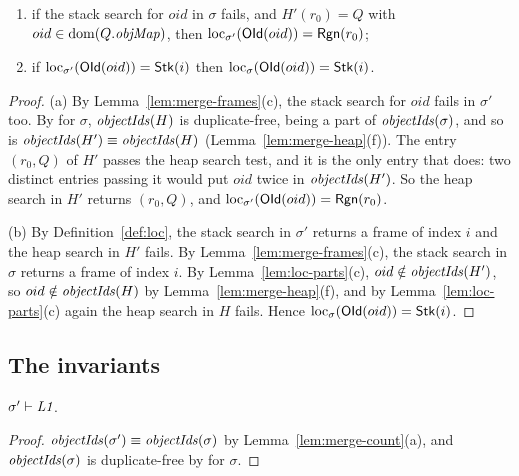 \begin{lemma}
\label{lem:merge-loc}
\begin{enumerate}[nosep,label=(\alph*)]
  \item if the stack search for $oid$ in $\sigma$ fails, and $H'(r_0) = Q$ with
    $oid \in \mathrm{dom}(Q.\mathit{objMap})$, then $\mathrm{loc}_{\sigma'}(\mathsf{OId}(oid)) = \mathsf{Rgn}(r_0)$;
  \item if $\mathrm{loc}_{\sigma'}(\mathsf{OId}(oid)) = \mathsf{Stk}(i)$ then $\mathrm{loc}_{\sigma}(\mathsf{OId}(oid)) = \mathsf{Stk}(i)$.
\end{enumerate}
\end{lemma}
\begin{proof}
(a) By Lemma~\ref{lem:merge-frames}(c), the stack search for $oid$ fails in $\sigma'$ too. By 
for $\sigma$, $\mathit{objectIds}(H)$ is duplicate-free, being a part of $\mathit{objectIds}(\sigma)$, and so is $\mathit{objectIds}(H') \equiv \mathit{objectIds}(H)$
(Lemma~\ref{lem:merge-heap}(f)). The entry $(r_0, Q)$ of $H'$ passes the heap search test, and it is the
only entry that does: two distinct entries passing it would put $oid$ twice in $\mathit{objectIds}(H')$. So the
heap search in $H'$ returns $(r_0, Q)$, and $\mathrm{loc}_{\sigma'}(\mathsf{OId}(oid)) = \mathsf{Rgn}(r_0)$.

(b) By Definition~\ref{def:loc}, the stack search in $\sigma'$ returns a frame of index $i$ and the
heap search in $H'$ fails. By Lemma~\ref{lem:merge-frames}(c), the stack search in $\sigma$ returns a
frame of index $i$. By Lemma~\ref{lem:loc-parts}(c), $oid \notin \mathit{objectIds}(H')$, so $oid \notin \mathit{objectIds}(H)$ by
Lemma~\ref{lem:merge-heap}(f), and by Lemma~\ref{lem:loc-parts}(c) again the heap search in $H$
fails. Hence
$\mathrm{loc}_{\sigma}(\mathsf{OId}(oid)) = \mathsf{Stk}(i)$.
\end{proof}

\subsection{The invariants}

\begin{lemma}[\inv{L1}] 
$\sigma' \vdash \textit{L1}$.
\end{lemma}
\begin{proof}
$\mathit{objectIds}(\sigma') \equiv \mathit{objectIds}(\sigma)$ by Lemma~\ref{lem:merge-count}(a), and $\mathit{objectIds}(\sigma)$ is
duplicate-free by  for $\sigma$.
\end{proof}

